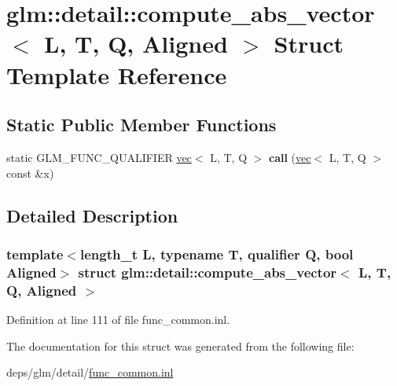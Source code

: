\hypertarget{structglm_1_1detail_1_1compute__abs__vector}{}\section{glm\+:\+:detail\+:\+:compute\+\_\+abs\+\_\+vector$<$ L, T, Q, Aligned $>$ Struct Template Reference}
\label{structglm_1_1detail_1_1compute__abs__vector}
\subsection*{Static Public Member Functions}
\begin{DoxyCompactItemize}
\item 
\mbox{\label{structglm_1_1detail_1_1compute__abs__vector_a888d9125f1091c659f0135bafdbe6c19}} 
static G\+L\+M\+\_\+\+F\+U\+N\+C\+\_\+\+Q\+U\+A\+L\+I\+F\+I\+ER \hyperlink{structglm_1_1vec}{vec}$<$ L, T, Q $>$ {\bfseries call} (\hyperlink{structglm_1_1vec}{vec}$<$ L, T, Q $>$ const \&x)
\end{DoxyCompactItemize}


\subsection{Detailed Description}
\subsubsection*{template$<$length\+\_\+t L, typename T, qualifier Q, bool Aligned$>$\newline
struct glm\+::detail\+::compute\+\_\+abs\+\_\+vector$<$ L, T, Q, Aligned $>$}



Definition at line 111 of file func\+\_\+common.\+inl.



The documentation for this struct was generated from the following file\+:\begin{DoxyCompactItemize}
\item 
deps/glm/detail/\hyperlink{func__common_8inl}{func\+\_\+common.\+inl}\end{DoxyCompactItemize}
